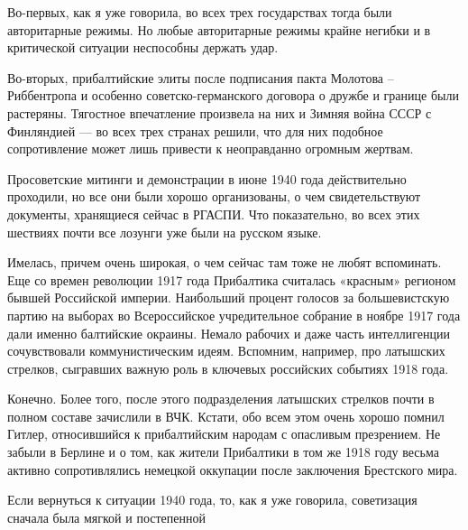 
Во-первых, как я уже говорила, во всех трех государствах тогда были
авторитарные режимы. Но любые авторитарные режимы крайне негибки и в
критической ситуации неспособны держать удар.

Во-вторых, прибалтийские элиты после подписания пакта Молотова – Риббентропа и
особенно советско-германского договора о дружбе и границе были растеряны.
Тягостное впечатление произвела на них и Зимняя война СССР с Финляндией — во
всех трех странах решили, что для них подобное сопротивление может лишь
привести к неоправданно огромным жертвам.


Просоветские митинги и демонстрации в июне 1940 года действительно проходили,
но все они были хорошо организованы, о чем свидетельствуют документы,
хранящиеся сейчас в РГАСПИ. Что показательно, во всех этих шествиях почти все
лозунги уже были на русском языке.


Имелась, причем очень широкая, о чем сейчас там тоже не любят вспоминать. Еще
со времен революции 1917 года Прибалтика считалась «красным» регионом бывшей
Российской империи. Наибольший процент голосов за большевистскую партию на
выборах во Всероссийское учредительное собрание в ноябре 1917 года дали именно
балтийские окраины. Немало рабочих и даже часть интеллигенции сочувствовали
коммунистическим идеям. Вспомним, например, про латышских стрелков, сыгравших
важную роль в ключевых российских событиях 1918 года.


Конечно. Более того, после этого подразделения латышских стрелков почти в
полном составе зачислили в ВЧК. Кстати, обо всем этом очень хорошо помнил
Гитлер, относившийся к прибалтийским народам с опасливым презрением. Не забыли
в Берлине и о том, как жители Прибалтики в том же 1918 году весьма активно
сопротивлялись немецкой оккупации после заключения Брестского мира.

\begin{leftbar}
\large
Если вернуться к ситуации 1940 года, то, как я уже говорила, советизация
сначала была мягкой и постепенной
\end{leftbar}

